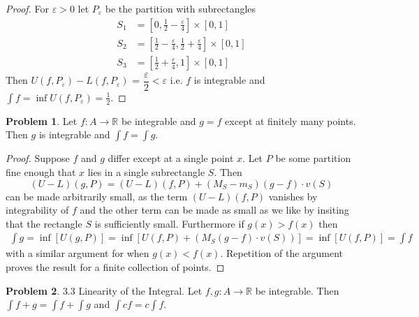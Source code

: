 \documentclass[20pt]{article}
\theoremstyle{plain}
\theoremstyle{definition}
\newtheorem*{problem}{Problem}
\newcommand{\reals}{\mathbb{R}}
\begin{document}
\begin{proof}
  For $\varepsilon > 0$ let $P_\varepsilon$ be the partition with subrectangles 
  \begin{align*}
    S_1 &= [0, \frac{1}{2} - \frac{\varepsilon}{4}] \times [0, 1] \\
    S_2 &= [\frac{1}{2} -\frac{\varepsilon}{4}, \frac{1}{2} + \frac{\varepsilon}{4}] \times [0, 1] \\
    S_3 &= [\frac{1}{2} + \frac{\varepsilon}{4}, 1] \times [0, 1]
   \end{align*}
   Then 
   $U(f, P_\varepsilon) - L(f, P_\varepsilon)$ = $\dfrac{\varepsilon}{2} < \varepsilon$ 
   i.e. $f$ is integrable
   and $\int f = \inf U(f, P_\varepsilon) = \frac{1}{2}.$
\end{proof}


\begin{problem}{3.2}
  Let $f: A \to \reals$ be integrable and $g = f$ except at finitely many points.
  Then $g$ is integrable and $\int f = \int g.$
\end{problem}

\begin{proof}
  Suppose $f$ and $g$ differ except at a single point $x$.
  Let $P$ be some partition fine enough that $x$ lies in a single 
  subrectangle $S$. Then
  $$(U-L)(g, P) = (U-L)(f, P) + (M_S-m_S)(g-f)\cdot v(S)$$
  can be made arbitrarily small, as the term $(U-L)(f, P)$ vanishes by 
  integrability of $f$ and the other term can be made as small
  as we like by insiting that the rectangle $S$ is sufficiently small. 
  Furthermore if $g(x) > f(x)$ then 
  \begin{align*}
    \int g = \inf [U(g, P)] = \inf[ U(f, P) + (M_S(g - f)\cdot v(S))] = \inf[U(f, P)] = \int f
  \end{align*}
  with a similar argument for when $g(x) < f(x).$  
  Repetition of the argument proves the result for a finite collection of 
  points.
\end{proof}


\begin{problem}{3.3 Linearity of the Integral.}
  Let $f, g: A \to \reals$ be integrable.
  Then $\int f+g  = \int f + \int g$ and $\int cf =c\int f$.
\end{problem}
\end{document}
